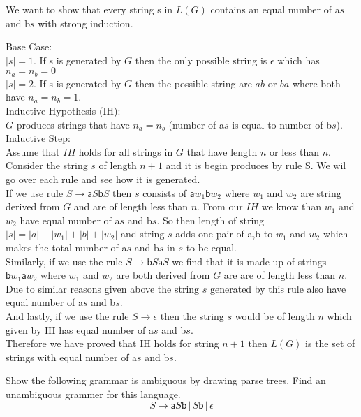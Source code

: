 \documentclass[12pt]{exam}
\begin{document}
\begin{questions}
  \begin{solution}

    We want to show that every string s in $L(G)$ contains an equal number of a$s$ and b$s$ with strong induction.

    Base Case:\\
    $|s| = 1$. If s is generated by $G$ then the only possible string is $\epsilon$ which has $n_{a}= n_{b}=0$\\
    $|s| = 2$. If s is generated by $G$ then the possible string are $ab$ or $ba$ where both have $n_{a} = n_{b} = 1$.\\
    Inductive Hypothesis (IH):\\
    $G$ produces strings that have $n_{a} = n_{b}$ (number of a$s$ is equal to number of b$s$).\\
    Inductive Step:\\
    Assume that $IH$ holds for all strings in $G$ that have length $n$ or less than $n$. Consider the string $s$ of length $n+1$ and it is begin produces by rule S. We wil go over each rule and see how it is generated.\\
    If we use rule $S\to \mathsf{a}S\mathsf{b}S$ then $s$ consists of $\mathsf{a}w_{1}\mathsf{b}w_{2}$ where $w_{1}$ and $w_{2}$ are string derived from $G$ and are of length less than $n$. From our $IH$ we know than $w_{1}$ and $w_{2}$ have equal number of a$s$ and b$s$. So then length of string $|s| = |a| + |w_{1}| + |b| + |w_{2}|$ and string $s$ adds one pair of a,b to $w_{1}$ and $w_{2}$ which makes the total number of a$s$ and b$s$ in $s$ to be equal.\\
    Similarly, if we use the rule $S\to \mathsf{b}S\mathsf{a}S$ we find that it is made up of strings $\mathsf{b}w_{1}\mathsf{a}w_{2}$ where $w_{1}$ and $w_{2}$ are both derived from $G$ are are of length less than $n$. Due to similar reasons given above the string $s$ generated by this rule also have equal number of a$s$ and b$s$.\\
    And lastly, if we use the rule $S\to \epsilon$ then the string $s$ would be of length $n$ which given by IH has equal number of a$s$ and b$s$.\\
    Therefore we have proved that IH holds for string $n+1$ then $L(G)$ is the set of strings with equal number of a$s$ and b$s$.
  \end{solution}


  \question{}
  Show the following grammar is ambiguous by drawing parse trees. Find an unambiguous grammer for this language.
  \[S\to \mathsf{a}S\mathsf{b}\,|\, S\mathsf{b}\,|\,\epsilon\]


\end{questions}
\end{document}
